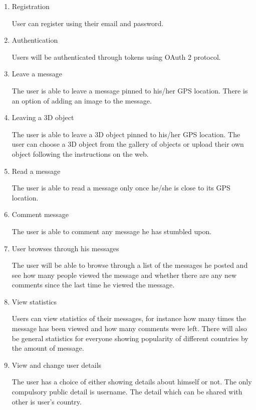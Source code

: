 \documentclass[thesis=M,english]{FITthesis}[2012/10/20]
\begin{document}
\begin{enumerate}
\item{Registration}

User can register using their email and password.

\item{Authentication}

Users will be authenticated through tokens using OAuth 2 protocol. 

\item{Leave a message}

The user is able to leave a message pinned to his/her GPS location. There is an option of adding an image to the message.

\item{Leaving a 3D object}

The user is able to leave a 3D object pinned to his/her GPS location. The user can choose a 3D object from the gallery of objects or upload their own object following the instructions on the web.

\item{Read a message}

The user is able to read a message only once he/she is close to its GPS location.

\item{Comment message}

The user is able to comment any message he has stumbled upon.

\item{User browses through his messages}

The user will be able to browse through a list of the messages he posted and see how many people viewed the message and whether there are any new comments since the last time he viewed the message.

\item{View statistics}

Users can view statistics of their messages, for instance how many times the message has been viewed and how many comments were left. There will also be general statistics for everyone showing popularity of different countries by the amount of message.

\item{View and change user details}

The user has a choice of either showing details about himself or not. The only compulsory public detail is username. The detail which can be shared with other is user's country.

\end{enumerate}
\end{document}
